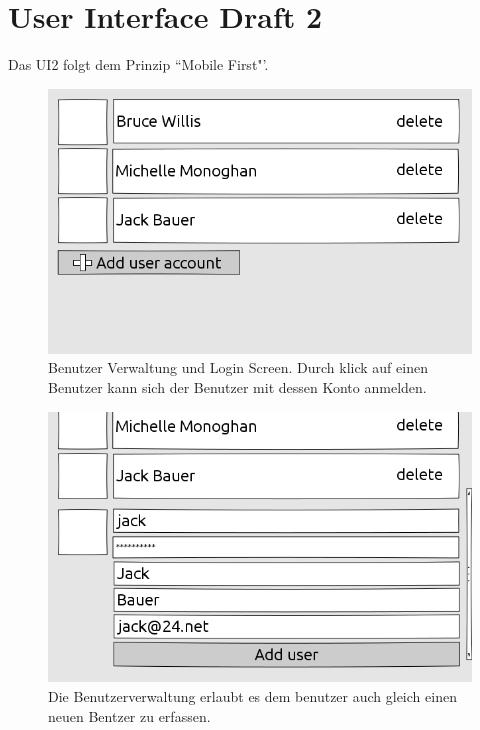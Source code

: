 \section{User Interface Draft 2}
	Das UI2 folgt dem Prinzip ``Mobile First"'.
	\begin{figure}[H]
		\centering
		\includegraphics[height=0.35\textheight]{../ui/img/uiDraft2/UserView-selectUser.png}
		\caption{Benutzer Verwaltung und Login Screen. Durch klick auf einen Benutzer kann sich der Benutzer mit dessen Konto anmelden.}
		\label{login screen}
	\end{figure}
	\begin{figure}[H]
		\centering
		\includegraphics[height=0.35\textheight]{../ui/img/uiDraft2/UserView-addUser.png}
		\caption{Die Benutzerverwaltung erlaubt es dem benutzer auch gleich einen neuen Bentzer zu erfassen.}
		\label{user management screen}
	\end{figure}
